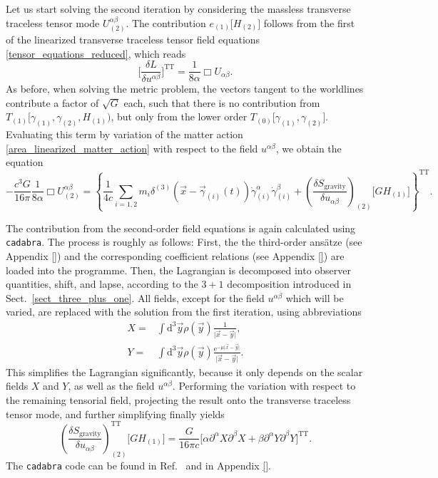 Let us start solving the second iteration by considering the massless transverse traceless tensor mode $U^{\alpha\beta}_{(2)}$. The contribution $e_{(1)}\lbrack H_{(2)}\rbrack$ follows from the first of the linearized transverse traceless tensor field equations \eqref{tensor_equations_reduced}, which reads
\begin{equation}
  \bigg\lbrack\frac{\delta L}{\delta u^{\alpha\beta}}\bigg\rbrack^\text{TT} = \frac{1}{8\alpha} \Box U_{\alpha\beta}.
\end{equation}
As before, when solving the metric problem, the vectors tangent to the worldlines contribute a factor of $\sqrt{G}$ each, such that there is no contribution from $T_{(1)}\lbrack\gamma_{(1)},\gamma_{(2)},H_{(1)})$, but only from the lower order $T_{(0)}\lbrack\gamma_{(1)},\gamma_{(2)}\rbrack$. Evaluating this term by variation of the matter action \eqref{area_linearized_matter_action} with respect to the field $u^{\alpha\beta}$, we obtain the equation
\begin{equation}\label{area_massless_tt_equation}
  -\frac{c^3G}{16\pi} \frac{1}{8\alpha} \Box U^{\alpha\beta}_{(2)} = \left\{\frac{1}{4c}\sum_{i=1,2} m_i \delta^{(3)}(\vec x-\vec\gamma_{(i)}(t))\dot\gamma^\alpha_{(i)}\dot\gamma^\beta_{(i)} + \left(\frac{\delta S_\text{gravity}}{\delta u_{\alpha\beta}}\right)_{(2)}\lbrack GH_{(1)}\rbrack \right\}^\text{TT}.
\end{equation}

The contribution from the second-order field equations is again calculated using \texttt{cadabra}. The process is roughly as follows: First, the the third-order ansätze (see Appendix \ref{}) and the corresponding coefficient relations (see Appendix \ref{}) are loaded into the programme. Then, the Lagrangian is decomposed into observer quantities, shift, and lapse, according to the $3+1$ decomposition introduced in Sect.~\ref{sect_three_plus_one}. All fields, except for the field $u^{\alpha\beta}$ which will be varied, are replaced with the solution from the first iteration, using abbreviations
\begin{equation}
  \begin{aligned}
    X = &{} \int\mathrm d^3\vec y\rho(\vec y)\frac{1}{\lvert\vec x-\vec y\rvert}, \\
    Y = &{} \int\mathrm d^3\vec y\rho(\vec y)\frac{\mathrm e^{-\mu\lvert\vec x-\vec y\rvert}}{\lvert\vec x-\vec y\rvert}.
  \end{aligned}
\end{equation}
This simplifies the Lagrangian significantly, because it only depends on the scalar fields $X$ and $Y$, as well as the field $u^{\alpha\beta}$. Performing the variation with respect to the remaining tensorial field, projecting the result onto the transverse traceless tensor mode, and further simplifying finally yields
\begin{equation}
  \left(\frac{\delta S_\text{gravity}}{\delta u_{\alpha\beta}}\right)^\text{TT}_{(2)}\lbrack GH_{(1)}\rbrack = \frac{G}{16\pi c}\lbrack\alpha\partial^\alpha X\partial^\beta X + \beta\partial^\alpha Y\partial^\beta Y\rbrack^\text{TT}.
\end{equation}
The \texttt{cadabra} code can be found in Ref.~\cite{Alex_2020_area-metric-gravity} and in Appendix \ref{}.

